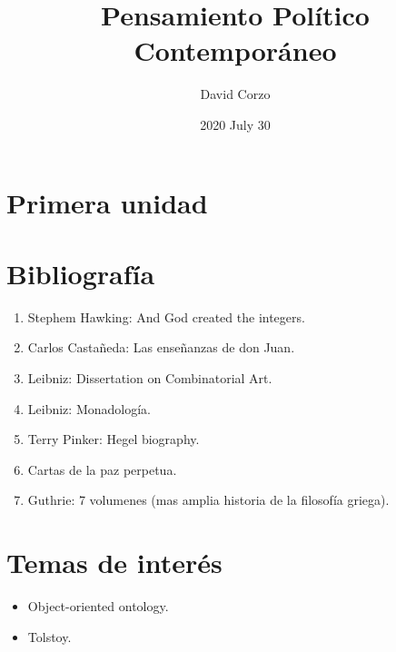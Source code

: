 \documentclass[openany]{book}
\title{Pensamiento Político Contemporáneo}
\date{2020 July 30} %
\author{David Corzo} %
\begin{document}
\maketitle
\tableofcontents

\chapter{Primera unidad}




\chapter{Bibliografía}
\begin{enumerate}
    \item Stephem Hawking: And God created the integers. 
    \item Carlos Castañeda: Las enseñanzas de don Juan.
    \item Leibniz: Dissertation on Combinatorial Art.
    \item Leibniz: Monadología.
    \item Terry Pinker: Hegel biography.
    \item Cartas de la paz perpetua.
    \item Guthrie: 7 volumenes (mas amplia historia de la filosofía griega).
\end{enumerate}

\chapter{Temas de interés}
\begin{itemize}
    \item Object-oriented ontology.
    \item Tolstoy.
\end{itemize}

\end{document}
